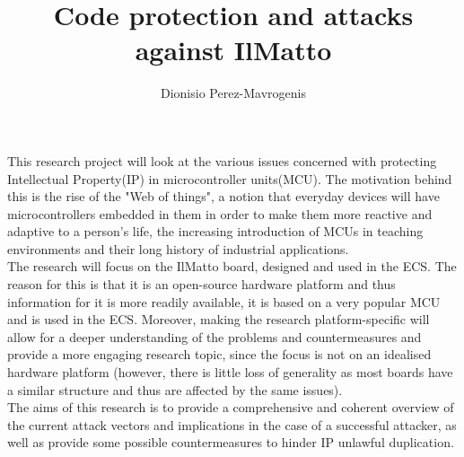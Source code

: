 \documentclass[12pt,a4paper,onecolumn]{article}
\author{Dionisio Perez-Mavrogenis}
\title{Code protection and attacks against IlMatto}
\begin{document}
\maketitle

This research project will look at the various issues concerned with protecting Intellectual Property(IP) in microcontroller units(MCU). The motivation behind this is the rise of the "Web of things", a notion that everyday devices will have microcontrollers embedded in them in order to make them more reactive and adaptive to a person's life, the increasing introduction of MCUs in teaching environments and their long history of industrial applications.\\

The research will focus on the IlMatto board, designed and used in the ECS. The reason for this is that it is an open-source hardware platform and thus information for it is more readily available, it is based on a very popular MCU and is used in the ECS. Moreover, making the research platform-specific will allow for a deeper understanding of the problems and countermeasures and provide a more engaging research topic, since the focus is not on an idealised hardware platform (however, there is little loss of generality as most boards have a similar structure and thus are affected by the same issues).\\

The aims of this research is to provide a comprehensive and coherent overview of the current attack vectors and implications in the case of a successful attacker, as well as provide some possible countermeasures to hinder IP unlawful duplication.
\end{document}

